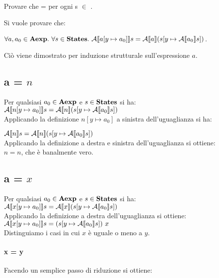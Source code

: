 {
	Provare che
	 =
	 per ogni s $\in$
	\states.
}
{
Si vuole provare che:

$\forall{a,a_0} \in \textbf{Aexp}.\mbox{ }
\forall{s} \in \textbf{States}.\mbox{ }
\mathcal{A} \llbracket a [y \mapsto{} a_0] \rrbracket s =
\mathcal{A} \llbracket a \rrbracket (s [y \mapsto{} \mathcal{A} \llbracket a_0 \rrbracket s])$.

Ciò viene dimostrato per induzione strutturale sull'espressione $a$.

\subsection{a = $n$} Per qualsiasi $a_0 \in \textbf{Aexp}$ e $s \in \textbf{States}$ si ha:
\\

$\mathcal{A} \llbracket n [y \mapsto{} a_0] \rrbracket s = \mathcal{A} \llbracket n \rrbracket (s [y \mapsto{} \mathcal{A} \llbracket a_0 \rrbracket s]) $
\\

Applicando la definizione $n [y \mapsto{} a_0]$ a sinistra dell'uguaglianza si
ha:

$\mathcal{A} \llbracket n \rrbracket s = \mathcal{A} \llbracket n \rrbracket (s [y \mapsto{} \mathcal{A} \llbracket a_0 \rrbracket s]) $
\\

Applicando la definizione  a destra e sinistra dell'uguaglianza si ottiene:
\\

$n = n$, che è banalmente vero.

\subsection{a = $x$} Per qualsiasi $a_0 \in \textbf{Aexp}$ e $s \in \textbf{States}$ si ha:
\\

$\mathcal{A} \llbracket x [y \mapsto{} a_0] \rrbracket s = \mathcal{A} \llbracket x \rrbracket (s [y \mapsto{} \mathcal{A} \llbracket a_0 \rrbracket s]) $
\\

Applicando la definizione  a destra dell'uguaglianza si ottiene:
\\

$\mathcal{A} \llbracket x [y \mapsto{} a_0] \rrbracket s = (s [y \mapsto{} \mathcal{A} \llbracket a_0 \rrbracket s]) \mbox{ } x $
\\

Distinguiamo i casi in cui $x$ è uguale o meno a $y$.

\paragraph{x = y} Facendo un semplice passo di riduzione si ottiene:
\\

}
